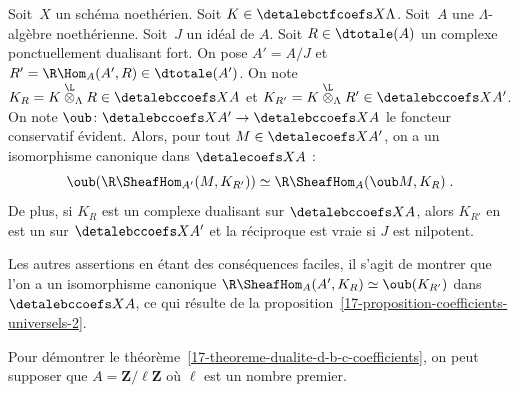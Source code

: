 \documentclass[10pt]{../fichiers-configuration-latex/smfart}
\begin{document}
\begin{proposition3}\label{17-proposition-complexes-dualisants-quotient-par-ideal}
Soit $X$ un schéma noethérien. Soit $K\in\detalebctfcoefs X \Lambda$.
Soit $A$ une
$\Lambda$-algèbre noethérienne. Soit $J$ un idéal de $A$. Soit
$R\in\dtotale(A)$ un complexe ponctuellement dualisant fort. On pose
$A'=A/J$ et $R'=\R\Hom_A(A',R)\in\dtotale(A')$. On note
$K_R=K\overset{\L}\otimes_\Lambda R\in\detalebccoefs X A$ et $K_{R'}=
K\overset{\L}\otimes_\Lambda {R'}\in\detalebccoefs X {A'}$. On note
$\oub\colon \detalebccoefs X {A'}\to\detalebccoefs X A$ le foncteur conservatif
évident. Alors, pour tout $M\in\detalecoefs X {A'}$, on a un isomorphisme
canonique dans $\detalecoefs X A$ :
\[\oub(\R\SheafHom_{A'}(M,K_{R'}))\simeq \R\SheafHom_A(\oub
M,K_R)\;\text{.}\]
De plus, si $K_R$ est un complexe dualisant sur $\detalebccoefs X A$, alors
$K_{R'}$ en est un sur $\detalebccoefs X {A'}$ et la réciproque est vraie si
$J$ est nilpotent.
\end{proposition3}

Les autres assertions en étant des conséquences faciles, il s'agit de
montrer que l'on a un isomorphisme canonique
$\R\SheafHom_A(A',K_R)\simeq \oub(K_{R'})$ dans $\detalebccoefs X A$, ce
qui résulte de la proposition~\ref{17-proposition-coefficients-universels-2}.

\begin{corollaire3}\label{17-corollaire-reduction-theoreme-dualite-d-b-c-coefs-z-l}
Pour démontrer le théorème~\ref{17-theoreme-dualite-d-b-c-coefficients}, on
peut supposer que $A=\mathbf{Z}/\ell\mathbf{Z}$ où $\ell$ est un nombre
premier.
\end{corollaire3}
\end{document}
